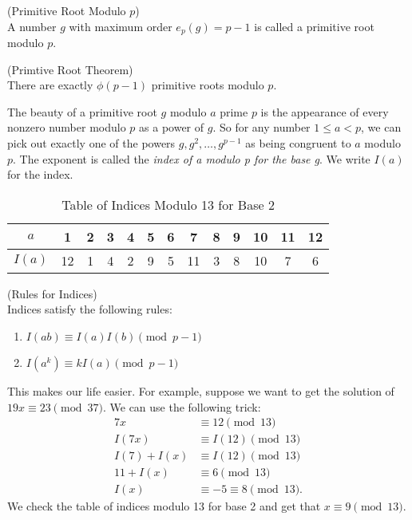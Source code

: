 \begin{definition}
  (Primitive Root Modulo $p$) \\
  A number $g$ with maximum order $e_{p}(g) = p - 1$ is called a primitive root modulo $p$.
\end{definition}

\begin{theorem}
  (Primtive Root Theorem) \\
  There are exactly $\phi(p - 1)$ primitive roots modulo $p$.
\end{theorem}

The beauty of a primitive root $g$ modulo $a$ prime $p$ is the appearance of every nonzero number modulo $p$ as a power of $g$. So for any number $1\leq a < p$, we can pick out exactly one of the powers $g, g^{2}, \dots, g^{p - 1}$ as being congruent to $a$ modulo $p$. The exponent is called the \textit{index of a modulo p for the base g}. We write $I(a)$ for the index.

\begin{table}[h!]
\centering
\begin{tabular}{|c||c c c c c c c c c c c c|} 
  \hline
  $a$ & 1 & 2 & 3 & 4 & 5 & 6 & 7 & 8 & 9 & 10 & 11 & 12 \\
  \hline 
  $I(a)$ & 12 & 1 & 4 & 2 & 9 & 5 & 11 & 3 & 8 & 10 & 7 & 6 \\
  \hline
\end{tabular}
\caption{Table of Indices Modulo 13 for Base 2}
\end{table}

\begin{theorem}
  (Rules for Indices) \\
  Indices satisfy the following rules:
  \begin{enumerate}
    \item $I(ab)\equiv I(a)I(b) \pmod{p - 1}$
    \item $I(a^{k})\equiv kI(a) \pmod{p - 1}$
  \end{enumerate}
\end{theorem}

This makes our life easier. For example, suppose we want to get the solution of $19x\equiv 23\pmod{37}$. We can use the following trick:
\begin{align*}
  7x &\equiv 12 \pmod{13} \\
  I(7x) &\equiv I(12) \pmod{13} \\
  I(7) + I(x) &\equiv I(12) \pmod{13} \\
  11 + I(x) &\equiv 6 \pmod{13} \\
  I(x) &\equiv -5 \equiv 8 \pmod{13}.
\end{align*}
We check the table of indices modulo 13 for base 2 and get that $x\equiv 9\pmod{13}$.